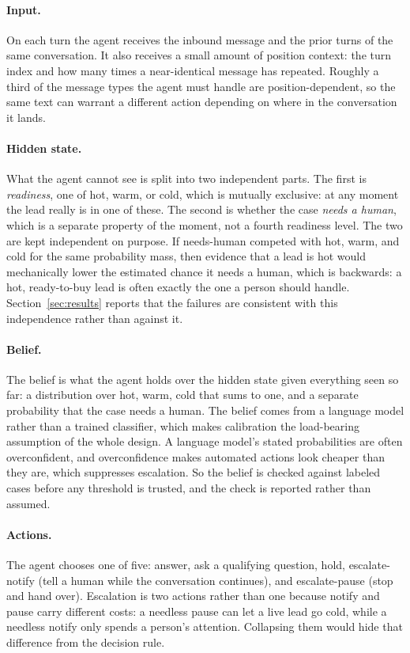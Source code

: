 \documentclass{article}
\begin{document}
\paragraph{Input.} On each turn the agent receives the inbound message and the
prior turns of the same conversation. It also receives a small amount of
position context: the turn index and how many times a near-identical message has
repeated. Roughly a third of the message types the agent must handle are
position-dependent, so the same text can warrant a different action depending on
where in the conversation it lands.

\paragraph{Hidden state.} What the agent cannot see is split into two independent
parts. The first is \emph{readiness}, one of hot, warm, or cold, which is
mutually exclusive: at any moment the lead really is in one of these. The second
is whether the case \emph{needs a human}, which is a separate property of the
moment, not a fourth readiness level. The two are kept independent on purpose. If
needs-human competed with hot, warm, and cold for the same probability mass, then
evidence that a lead is hot would mechanically lower the estimated chance it needs
a human, which is backwards: a hot, ready-to-buy lead is often exactly the one a
person should handle. Section~\ref{sec:results} reports that the failures are
consistent with this independence rather than against it.

\paragraph{Belief.} The belief is what the agent holds over the hidden state
given everything seen so far: a distribution over hot, warm, cold that sums to
one, and a separate probability that the case needs a human. The belief comes
from a language model rather than a trained classifier, which makes calibration
the load-bearing assumption of the whole design. A language model's stated
probabilities are often overconfident, and overconfidence makes automated actions
look cheaper than they are, which suppresses escalation. So the belief is checked
against labeled cases before any threshold is trusted, and the check is reported
rather than assumed.

\paragraph{Actions.} The agent chooses one of five: answer, ask a qualifying
question, hold, escalate-notify (tell a human while the conversation continues),
and escalate-pause (stop and hand over). Escalation is two actions rather than
one because notify and pause carry different costs: a needless pause can let a
live lead go cold, while a needless notify only spends a person's attention.
Collapsing them would hide that difference from the decision rule.
\end{document}
